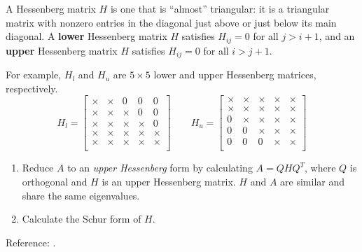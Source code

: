 \documentclass{article}
\begin{document}
\begin{tcolorbox}[title={Hessenberg matrix},colback=blue!5!white,colframe=blue!75!black,parbox=false]
	A Hessenberg matrix $H$ is one that is ``almost'' triangular: it is a triangular matrix with nonzero entries in the diagonal just above or just below its main diagonal. A \textbf{lower} Hessenberg matrix $H$ satisfies $H_{ij}=0$ for all $j>i+1$, and an \textbf{upper} Hessenberg matrix $H$ satisfies $H_{ij}=0$ for all $i>j+1$.

	For example, $H_l$ and $H_u$ are $5\times 5$ lower and upper Hessenberg matrices, respectively.
	\begin{equation*}
	    H_l=\begin{bmatrix}
			\times & \times & 0 & 0 & 0 \\
			\times & \times & \times & 0 & 0 \\
			\times & \times & \times & \times & 0 \\
			\times & \times & \times & \times & \times \\
			\times & \times & \times & \times & \times \\
	    \end{bmatrix}
		\qquad
	    H_u=\begin{bmatrix}
			\times & \times & \times & \times & \times \\
			\times & \times & \times & \times & \times \\
			0 & \times & \times & \times & \times \\
			0 & 0 & \times & \times & \times \\
			0 & 0 & 0 & \times & \times \\
	    \end{bmatrix}
	\end{equation*}
\end{tcolorbox}

\begin{tcolorbox}[title={\textsc{Lapack} Algorithm},colback=red!5!white,colframe=red!75!black,parbox=false]
	\begin{enumerate}
		\item Reduce $A$ to an \textit{upper Hessenberg} form by calculating $A=QHQ^T$, where $Q$ is orthogonal and $H$ is an upper Hessenberg matrix. $H$ and $A$ are similar and share the same eigenvalues.
		\item Calculate the Schur form of $H$.
	\end{enumerate}
	Reference: \cite{lapack:eig}.
\end{tcolorbox}
\end{document}

